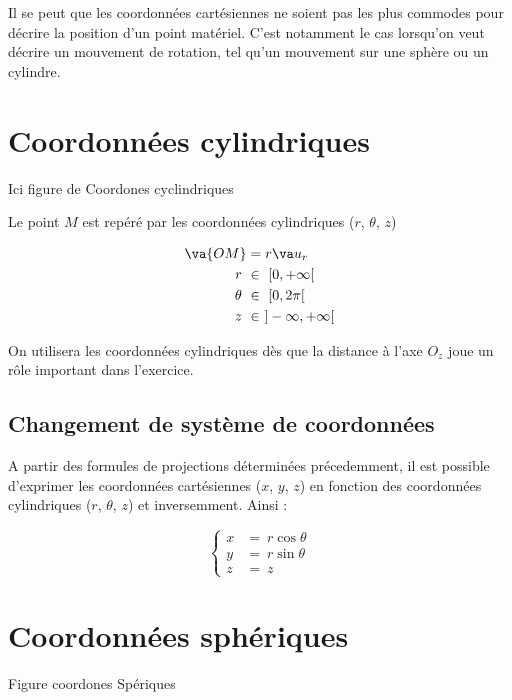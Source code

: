 \documentclass[
  12pt,
  openany]{book}
\theoremstyle{plain}
\theoremstyle{remark}
\begin{document}
Il se peut que les coordonnées cartésiennes ne soient pas les plus
commodes pour décrire la position d'un point matériel. C'est notamment
le cas lorsqu'on veut décrire un mouvement de rotation, tel qu'un
mouvement sur une sphère ou un cylindre.

\section{Coordonnées cylindriques}\label{coordonnuxe9es-cylindriques}

Ici figure de Coordones cyclindriques

Le point \(M\) est repéré par les coordonnées cylindriques (\(r\),
\(\theta\), \(z\))

\begin{align*}
  \va{OM} &= r \va u_r  \\ r \ &\in \ [0, +\infty[ \\ \theta \ &\in \ [0, 2\pi[ \\ z \ &\in \ ]-\infty, +\infty[
\end{align*}

On utilisera les coordonnées cylindriques dès que la distance à l'axe
\(O_z\) joue un rôle important dans l'exercice.

\subsection{Changement de système de
coordonnées}\label{changement-de-systuxe8me-de-coordonnuxe9es}

A partir des formules de projections déterminées précedemment, il est
possible d'exprimer les coordonnées cartésiennes (\(x\), \(y\), \(z\))
en fonction des coordonnées cylindriques (\(r\), \(\theta\), \(z\)) et
inversemment. Ainsi :

\begin{equation*}
    \begin{cases}
      x &= \ r \cos{\theta}  \\
      y &= \ r \sin{\theta} \\
      z &= \ z
    \end{cases}       
\end{equation*}

\section{Coordonnées sphériques}\label{coordonnuxe9es-sphuxe9riques}

Figure coordones Spériques
\end{document}
